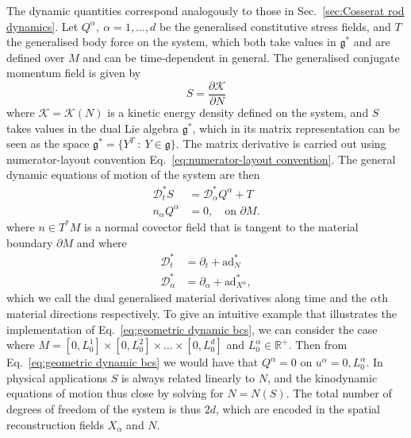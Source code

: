 The dynamic quantities correspond analogously to those in Sec.~\ref{sec:Cosserat rod dynamics}. Let $Q^\alpha,\ \alpha = 1, \dots, d$ be the generalised constitutive stress fields, and $T$ the generalised body force on the system, which both take values in $\mathfrak{g}^*$ and are defined over $M$ and can be time-dependent in general. The generalised conjugate momentum field is given by
\begin{equation} \label{eq:(summary) generalised conjguate momentum}
S = \frac{\partial \mathcal{K}}{\partial N}
\end{equation}
where $\mathcal{K} = \mathcal{K}(N)$ is a kinetic energy density defined on the system, and $S$ takes values in the dual Lie algebra $\mathfrak{g}^*$, which in its matrix representation can be seen as the space $\mathfrak{g}^* = \{ Y^T\ :\ Y \in \mathfrak{g} \}$. The matrix derivative is carried out using numerator-layout convention Eq.~\ref{eq:numerator-layout convention}. The general dynamic equations of motion of the system are then
\begin{subequations} \label{eq:(summary) dynamical equations of motion}
\begin{align}
\mathcal{D}^*_t S & = \mathcal{D}^*_\alpha Q^\alpha + T \\
n_\alpha Q^\alpha & = 0, \quad \text{on } \partial M. \label{eq:geometric dynamic bcs}
\end{align}
\end{subequations}
where $n \in T^*M$ is a normal covector field that is tangent to the material boundary $\partial M$ and where
\begin{subequations}
\begin{align}
\mathcal{D}^*_t & = \partial_t + \text{ad}_N^* \\
\mathcal{D}^*_\alpha & = \partial_\alpha + \text{ad}_{X^\alpha}^*,
\end{align}
\end{subequations}
which we call the dual generalised material derivatives along time and the $\alpha$th material directions respectively. To give an intuitive example that illustrates the implementation of Eq.~\ref{eq:geometric dynamic bcs}, we can consider the case where $M = [0, L_0^1] \times [0, L_0^2] \times \dots \times [0, L_0^d]$ and $L_0^\alpha \in \mathbb{R}^+$. Then from Eq.~\ref{eq:geometric dynamic bcs} we would have that $Q^\alpha = 0$ on $u^\alpha = 0, L^\alpha_0$. In physical applications $S$ is always related linearly to $N$, and the kinodynamic equations of motion thus close by solving for $N = N(S)$. The total number of degrees of freedom of the system is thus $2d$, which are encoded in the spatial reconstruction fields $X_\alpha$ and $N$.

